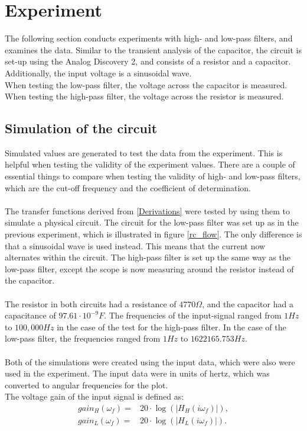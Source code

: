 \section{Experiment} \label{experiment}
The following section conducts experiments with high- and low-pass filters, and examines the data. Similar to the transient analysis of the capacitor, the circuit is set-up using the Analog Discovery 2, and consists of a resistor and a capacitor. Additionally, the input voltage  is a  sinusoidal wave. \\
When testing the low-pass filter, the voltage across the capacitor is measured. When testing the high-pass filter, the voltage across the resistor is measured.

\subsection{Simulation of the circuit}
Simulated values are generated to test the data from the experiment. This is helpful when testing the validity of the experiment values. There are a couple of essential things to compare when testing the validity of high- and low-pass filters, which are the cut-off frequency and the coefficient of determination. 
\\ \\
The transfer functions derived from \cref{Derivations} were tested by using them to simulate a physical circuit. The circuit for the low-pass filter was set up as in the previous experiment, which is illustrated in figure \ref{rc_flow}. The only difference is that a sinusoidal wave is used instead. This means that the current now alternates within the circuit. The high-pass filter is set up the same way as the low-pass filter, except the scope is now measuring around the resistor instead of the capacitor.
\\
\\
The resistor in both circuits had a resistance of $4770 \Omega$, and the capacitor had a capacitance of $97.61\cdot 10^{-9} F$. The frequencies of the input-signal ranged from $1 Hz$ to $100,000 Hz$ in the case of the test for the high-pass filter. In the case of the low-pass filter, the frequencies ranged from $1 Hz$ to $1622165.753 Hz$.
\\
\\
Both of the simulations were created using the input data, which were also were used in the experiment. The input data were in units of hertz, which was converted to angular frequencies for the plot.
\\
The voltage gain of the input signal is defined as:
\begin{align*}
	gain_H(\omega _f) =&20 \cdot \log{\left( \left|H_{H}(i \omega_f)\right| \right)},
	\\
	gain_L(\omega _f) =&20 \cdot \log{\left( \left|H_{L}(i \omega_f)\right| \right)}.
\end{align*}

